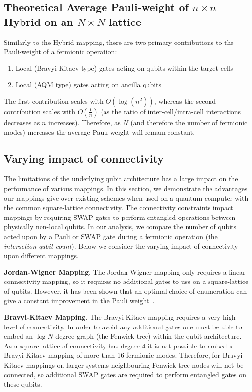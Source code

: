 \documentclass[pdftex,pra,aps,twocolumn,twoside]{revtex4-2}
\theoremstyle{plain}
\theoremstyle{note}
\newcommand\+{{\footnotesize \raisebox{0.3ex}{+}}}
\begin{document}
\subsection{Theoretical Average Pauli-weight of $n\times n$ Hybrid\+ on an $N\times N$ lattice}
Similarly to the Hybrid mapping, there are two primary contributions to the Pauli-weight of a fermionic operation:
\begin{enumerate}
    \item Local (Bravyi-Kitaev type) gates acting on qubits within the target cells
    \item Local (AQM type) gates acting on ancilla qubits
\end{enumerate}
The first contribution scales with $O(\log(n^2))$, whereas the second contribution scales with $O(\frac{1}{n})$ (as the ratio of inter-cell/intra-cell interactions decreases as $n$ increases). Therefore, as $N$ (and therefore the number of fermionic modes) increases the average Pauli-weight will remain constant.

\subsection{Varying impact of connectivity}
\label{section:connectivity}
The limitations of the underlying qubit architecture has a large impact on the performance of various mappings. In this section, we demonstrate the advantages our mappings give over existing schemes when used on a quantum computer with the common square-lattice connectivity. The connectivity constraints impact mappings by requiring SWAP gates to perform entangled operations between physically non-local qubits. In our analysis, we compare the number of qubits acted upon by a Pauli or SWAP gate during a fermionic operation (the \textit{interaction qubit count}). Below we consider the varying impact of connectivity upon different mappings.

\textbf {Jordan-Wigner Mapping}. The Jordan-Wigner mapping only requires a linear connectivity mapping, so it requires no additional gates to use on a square-lattice of qubits. However, it has been shown that an optimal choice of enumeration can give a constant improvement in the Pauli weight~\cite{chiew2021optimal}.

\textbf {Bravyi-Kitaev Mapping}.
The Bravyi-Kitaev mapping requires a very high level of connectivity. In order to avoid any additional gates one must be able to embed an $\log N$ degree graph (the Fenwick tree) within the qubit architecture. As a square-lattice of connectivity has degree $4$ it is not possible to embed a Bravyi-Kitaev mapping of more than 16 fermionic modes. Therefore, for Bravyi-Kitaev mappings on larger systems neighbouring Fenwick tree nodes will not be connected, so additional SWAP gates are required to perform entangled gates on these qubits.
\end{document}

